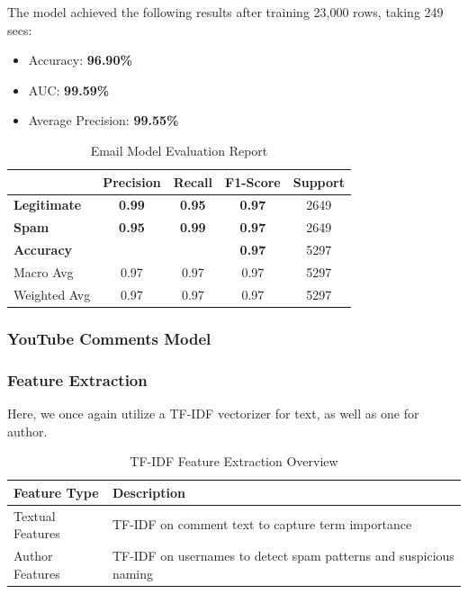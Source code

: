 \documentclass{article}
\begin{document}
\newpage

\noindent
The model achieved the following results after training 23,000 rows, taking 249 secs:

\begin{itemize}
    \item Accuracy: \textbf{96.90\%}
    \item AUC: \textbf{99.59\%}
    \item Average Precision: \textbf{99.55\%}
\end{itemize}

\begin{table}[htbp]
    \centering
    \caption{Email Model Evaluation Report}
    \begin{tabular}{l c c c c}
    \toprule
     & \textbf{Precision} & \textbf{Recall} & \textbf{F1-Score} & Support \\
    \midrule
    \textbf{Legitimate} & \textbf{0.99} & \textbf{0.95} & \textbf{0.97} & 2649 \\
    \textbf{Spam} & \textbf{0.95} & \textbf{0.99} & \textbf{0.97} & 2649 \\
    \midrule
    \textbf{Accuracy}  & & & \textbf{0.97} & 5297 \\
    Macro Avg & 0.97 & 0.97 & 0.97 & 5297 \\
    Weighted Avg & 0.97 & 0.97 & 0.97 & 5297 \\
    \bottomrule
    \end{tabular}
    \label{tab:xgboost_evaluation}
\end{table}


\subsubsection{YouTube Comments Model}
\subsubsection*{Feature Extraction}

Here, we once again utilize a TF-IDF vectorizer for text, as well as one for author.

\begin{table}[H]
\renewcommand{\arraystretch}{1.3}
\setlength{\tabcolsep}{10pt}
\centering
\begin{tabular}{|p{5cm}|p{9cm}|}
\hline
\textbf{Feature Type} & \textbf{Description} \\
\hline
Textual Features & TF-IDF on comment text to capture term importance \\
\hline
Author Features & TF-IDF on usernames to detect spam patterns and suspicious naming \\
\hline
\end{tabular}
\caption{TF-IDF Feature Extraction Overview}
\label{tab:tfidf_features}
\end{table}
\end{document}
